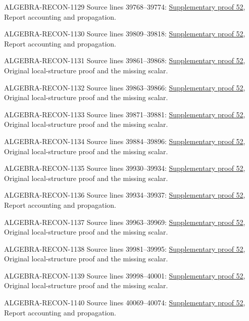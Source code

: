 \begin{AlgebraSourceRoutes}
\item[ALGEBRA-RECON-1129] Source lines 39768--39774: \hyperlink{algebra_etale_local_notes_20260928}{Supplementary proof 52}, Report accounting and propagation.
\item[ALGEBRA-RECON-1130] Source lines 39809--39818: \hyperlink{algebra_etale_local_notes_20260928}{Supplementary proof 52}, Report accounting and propagation.
\item[ALGEBRA-RECON-1131] Source lines 39861--39868: \hyperlink{algebra_etale_local_notes_20260928}{Supplementary proof 52}, Original local-structure proof and the missing scalar.
\item[ALGEBRA-RECON-1132] Source lines 39863--39866: \hyperlink{algebra_etale_local_notes_20260928}{Supplementary proof 52}, Original local-structure proof and the missing scalar.
\item[ALGEBRA-RECON-1133] Source lines 39871--39881: \hyperlink{algebra_etale_local_notes_20260928}{Supplementary proof 52}, Original local-structure proof and the missing scalar.
\item[ALGEBRA-RECON-1134] Source lines 39884--39896: \hyperlink{algebra_etale_local_notes_20260928}{Supplementary proof 52}, Original local-structure proof and the missing scalar.
\item[ALGEBRA-RECON-1135] Source lines 39930--39934: \hyperlink{algebra_etale_local_notes_20260928}{Supplementary proof 52}, Original local-structure proof and the missing scalar.
\item[ALGEBRA-RECON-1136] Source lines 39934--39937: \hyperlink{algebra_etale_local_notes_20260928}{Supplementary proof 52}, Report accounting and propagation.
\item[ALGEBRA-RECON-1137] Source lines 39963--39969: \hyperlink{algebra_etale_local_notes_20260928}{Supplementary proof 52}, Original local-structure proof and the missing scalar.
\item[ALGEBRA-RECON-1138] Source lines 39981--39995: \hyperlink{algebra_etale_local_notes_20260928}{Supplementary proof 52}, Original local-structure proof and the missing scalar.
\item[ALGEBRA-RECON-1139] Source lines 39998--40001: \hyperlink{algebra_etale_local_notes_20260928}{Supplementary proof 52}, Original local-structure proof and the missing scalar.
\item[ALGEBRA-RECON-1140] Source lines 40069--40074: \hyperlink{algebra_etale_local_notes_20260928}{Supplementary proof 52}, Report accounting and propagation.

\end{AlgebraSourceRoutes}
